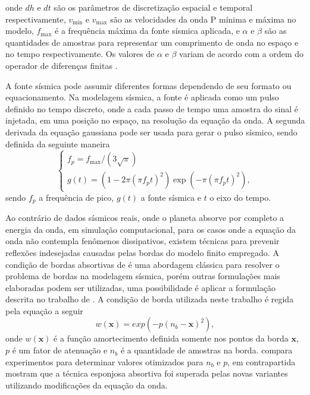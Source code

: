 \noindent onde $dh$ e $dt$ são os parâmetros de discretização espacial e temporal respectivamente, $v_{\text{min}}$ e $v_{\text{max}}$ são as velocidades da onda P mínima e máxima no modelo, $f_{\text{max}}$ é a frequência máxima da fonte sísmica aplicada, e $\alpha$ e $\beta$ são as quantidades de amostras para representar um comprimento de onda no espaço e no tempo respectivamente. Os valores de $\alpha$ e $\beta$ variam de acordo com a ordem do operador de diferenças finitas \cite{moczo2000stability, bulcao2004modelagem}.    

A fonte sísmica pode assumir diferentes formas dependendo de seu formato ou equacionamento. Na modelagem sísmica, a fonte é aplicada como um pulso definido no tempo discreto, onde a cada passo de tempo uma amostra do sinal é injetada, em uma posição no espaço, na resolução da equação da onda. A segunda derivada da equação gaussiana \cite{ricker1953form} pode ser usada para gerar o pulso sísmico, sendo definida da seguinte maneira
\begin{equation}
	\begin{cases}
		f_p = f_{\text{max}} / (3\sqrt{\pi}) \\
		g(t) = (1 - 2 \pi (\pi f_p t)^2) \exp(-\pi (\pi f_p t)^2),
		\label{ricker}
	\end{cases}
\end{equation}
\noindent sendo $f_p$ a frequência de pico, $g(t)$ a fonte sísmica e $t$ o eixo do tempo. 

Ao contrário de dados sísmicos reais, onde o planeta absorve por completo a energia da onda, em simulação computacional, para os casos onde a equação da onda não contempla fenômenos dissipativos, existem técnicas para prevenir reflexões indesejadas causadas pelas bordas do modelo finito empregado. A condição de bordas absortivas de  é uma abordagem clássica para resolver o problema de bordas na modelagem sísmica, porém outras formulações mais elaboradas podem ser utilizadas, uma possibilidade é aplicar a formulação descrita no trabalho de . A condição de borda utilizada neste trabalho é regida pela equação a seguir
\begin{equation}
	w(\mathbf{x}) = exp(- p(n_b - \mathbf{x})^2),
	\label{cerjan}	
\end{equation}      
\noindent onde $w(\mathbf{x})$ é a função amortecimento definida somente nos pontos da borda $\mathbf{x}$, $p$ é um fator de atenuação e $n_b$ é a quantidade de amostras na borda.  compara experimentos para determinar valores otimizados para $n_b$ e $p$, em contrapartida  mostram que a técnica esponjosa absortiva foi superada pelas novas variantes utilizando modificações da equação da onda. 

